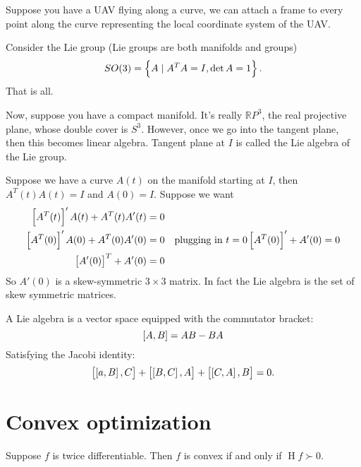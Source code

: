 \documentclass{article}
\DeclareMathOperator{\hess}{H}
\newcommand{\RR}{\mathbb{R}}
\begin{document}
Suppose you have a UAV flying along a curve, we can attach a frame to every point along the curve representing the local coordinate system of the UAV.

Consider the Lie group (Lie groups are both manifolds and groups)
\[SO(3) = \set{A \mid A^TA = I, \det A = 1}.\]
That is all.

Now, suppose you have a compact manifold.
It's really \(\RR P^3\), the real projective plane, whose double cover is \(S^3\).
However, once we go into the tangent plane, then this becomes linear algebra.
Tangent plane at \(I\) is called the Lie algebra of the Lie group.

Suppose we have a curve \(A(t)\) on the manifold starting at \(I\), then \(A^T(t)A(t) = I\) and \(A(0) = I\).
Suppose we want
\begin{align*}
  \sbr{A^T(t)}' A(t) + A^T(t)A'(t) = 0 && \\
  \sbr{A^T(0)}' A(0) + A^T(0)A'(0) = 0 && \text{plugging in \(t = 0\)}
                                        \sbr{A^T(0)}' + A'(0) = 0\\
  \sbr{A'(0)}^T + A'(0) = 0\\
\end{align*}
So \(A'(0)\) is a skew-symmetric \(3 \times 3\) matrix.
In fact the Lie algebra is the set of skew symmetric matrices.

A Lie algebra is a vector space equipped with the commutator bracket:
\[\sbr{A, B} = AB - BA\]
Satisfying the Jacobi identity:
\[\sbr{\sbr{a, B}, C} + \sbr{\sbr{B, C}, A} + \sbr{\sbr{C,A},B} = 0.\]

\section{Convex optimization}

Suppose \(f\) is twice differentiable.
Then \(f\) is convex if and only if \(\hess f \succ 0\).
\end{document}

